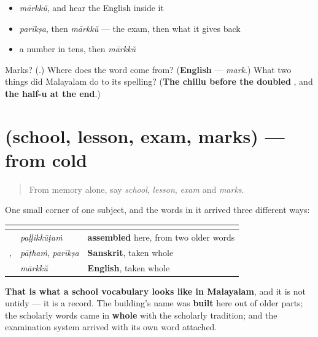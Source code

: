 \begin{itemize}
\raggedright
  \item \emph{mārkkŭ}, and hear the English inside it
  \item \emph{parīkṣa}, then \emph{mārkkŭ} — the exam, then what it gives back
  \item a number in tens, then \emph{mārkkŭ}
\end{itemize}

\begin{tcolorbox}[breakable,colback=teal!4,colframe=teal!35!black,title={Before you move on}]
Marks? (\textbf{}.) Where does the word come from? (\textbf{English} — \emph{mark}.) What two things did Malayalam do to its spelling? (\textbf{The chillu  before the doubled }, and \textbf{the half-u at the end}.)
\end{tcolorbox}
\section[(school, lesson, exam, marks)]{(school, lesson, exam, marks) — from cold}

\label{lesson:ML-R103-school-recall}



\begin{quote}
From memory alone, say \emph{school}, \emph{lesson}, \emph{exam} and \emph{marks}.
\end{quote}

\begin{grammarlens}[title={Grammar Lens: four words, three different arrivals}]
One small corner of one subject, and the words in it arrived three different ways:

\noindent
\begin{tabularx}{\linewidth}{@{}>{\raggedright\arraybackslash}X>{\raggedright\arraybackslash}X>{\raggedright\arraybackslash}X@{}}
\toprule
\textbf{} & \textbf{} & \textbf{} \\
\midrule
\textbf{\ml{പള്ളിക്കൂടം}} & \emph{paḷḷikkūṭaṁ} & \textbf{assembled} here, from two older words \\
\textbf{\ml{പാഠം}}, \textbf{\ml{പരീക്ഷ}} & \emph{pāṭhaṁ}, \emph{parīkṣa} & \textbf{Sanskrit}, taken whole \\
\textbf{\ml{മാർക്ക്}} & \emph{mārkkŭ} & \textbf{English}, taken whole \\
\bottomrule
\end{tabularx}

\textbf{That is what a school vocabulary looks like in Malayalam}, and it is not untidy — it is a record. The building's name was \textbf{built} here out of older parts; the scholarly words came in \textbf{whole} with the scholarly tradition; and the examination system arrived with its own word attached.
\end{grammarlens}

